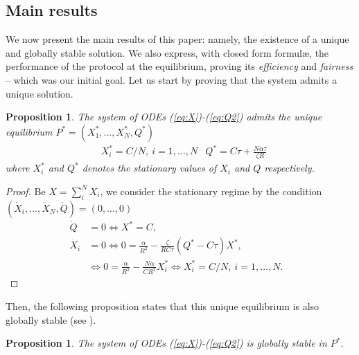 \documentclass[conference]{IEEEtran}
\newtheorem{prop}[theorem]{Proposition}
\begin{document}
\subsection{Main results}
We now present the main results of this paper: namely, the existence of a unique and globally stable solution. 
We also express, with closed form formul\ae, the performance of the protocol at the equilibrium, proving its 
\emph{efficiency} and \emph{fairness} -- which was our initial goal. Let us start by proving that the system admits 
a unique solution.
\begin{prop}\label{prop:one-flow1}
The system of ODEs (\ref{eq:X})-(\ref{eq:Q2}) admits the unique
equilibrium $P^*=(X_1^*,\dots, X_N^*,Q^*)$
\begin{align}\label{eq:steady-XQ}
  &X_i^*=C/N,~i=1,\dots,N  &Q^*=C\tau+\frac{N\alpha\tau }{\zeta R}
\end{align}
where $X_i^*$ and $Q^*$ denotes the stationary values of $X_i$ and $Q$ respectively.
\end{prop}
\vspace{-1mm}
\begin{proof}
Be $X=\sum_i^N X_i$, we consider the stationary regime by the condition
$(\dot{X}_i,\dots, \dot{X}_N,\dot{Q})=(0,\dots,0)$
\begin{align}
\dot{Q} &= 0 \Leftrightarrow X^*=C, &\nonumber \\
\dot{X_i} &= 0 \Leftrightarrow 0=\frac{\alpha}{R^2} - \frac{\zeta}{R C\tau } (Q^*-C\tau)X^*,\nonumber \\
&\Leftrightarrow 0=\frac{\alpha}{R^2}-\frac{N\alpha}{C R^2}X^*_i\Leftrightarrow X_i^*=C/N,~i=1,\dots,N.
\end{align}
\end{proof}
\noindent Then, the following proposition states that this unique equilibrium
is also globally stable (see \cite{Verhulst}).
\begin{prop}\label{prop:one-flow2}
The system of ODEs (\ref{eq:X})-(\ref{eq:Q2}) is globally stable in $P^*$.
\end{prop}
\end{document}
